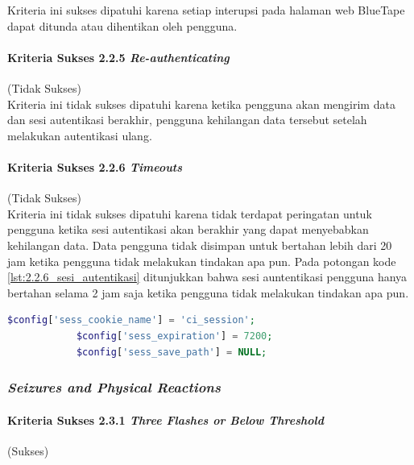 \documentclass[a4paper,twoside]{article}
\begin{document}
\begin{enumerate}
		Kriteria ini sukses dipatuhi karena setiap interupsi pada halaman web BlueTape dapat ditunda atau dihentikan oleh pengguna.

		\paragraph{Kriteria Sukses 2.2.5 \textit{Re-authenticating}}
		\label{par:kepatuhan_bluetape_kriteria_sukses_2.2.5}
		(Tidak Sukses)\\

		Kriteria ini tidak sukses dipatuhi karena ketika pengguna akan mengirim data dan sesi autentikasi berakhir, pengguna kehilangan data tersebut setelah melakukan autentikasi ulang.

		\paragraph{Kriteria Sukses 2.2.6 \textit{Timeouts}}
		\label{par:kepatuhan_bluetape_kriteria_sukses_2.2.6}
		(Tidak Sukses)\\

		Kriteria ini tidak sukses dipatuhi karena tidak terdapat peringatan untuk pengguna ketika sesi autentikasi akan berakhir yang dapat menyebabkan kehilangan data. Data pengguna tidak disimpan untuk bertahan lebih dari 20 jam ketika pengguna tidak melakukan tindakan apa pun. Pada potongan kode \ref{lst:2.2.6_sesi_autentikasi} ditunjukkan bahwa sesi auntentikasi pengguna hanya bertahan selama 2 jam saja ketika pengguna tidak melakukan tindakan apa pun.

		\begin{lstlisting}[frame=single, label={lst:2.2.6_sesi_autentikasi}, language=PHP, caption=Kriteria Sukses 2.2.6 - Sesi Autentikasi]
			$config['sess_cookie_name'] = 'ci_session';
			$config['sess_expiration'] = 7200;
			$config['sess_save_path'] = NULL;
		\end{lstlisting}

		\subsubsection*{\textit{Seizures and Physical Reactions}}
		\label{subsubsec:kepatuhan_bluetape_seizures_and_physical_reactions}

		\paragraph{Kriteria Sukses 2.3.1 \textit{Three Flashes or Below Threshold}}
		\label{par:kepatuhan_bluetape_kriteria_sukses_2.3.1}
		(Sukses)\\


\end{enumerate}
\end{document}
